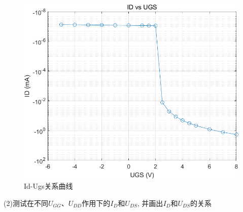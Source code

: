 \documentclass[10pt, a4paper]{article} %
\begin{document}
\newpage

\begin{figure}[htbp]
    \centering
    \includegraphics[width=0.8\linewidth]{image/5.png}
    \caption{Id-Ugs关系曲线}
    \label{fig:Id-Ugs}
\end{figure}

(2)测试在不同$U_{GG}$、$U_{DD}$作用下的$I_{D}$和$U_{DS}$, 并画出$I_{D}$和$U_{DS}$的关系
\end{document}
